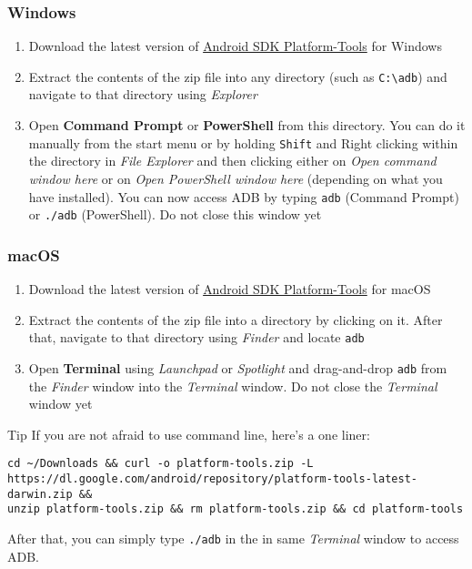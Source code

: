 \subsubsection{Windows} %
\begin{enumerate}
    \item Download the latest version of
    \href{https://dl.google.com/android/repository/platform-tools-latest-windows.zip}{Android SDK Platform-Tools} for
    Windows
    \item Extract the contents of the zip file into any directory (such as \texttt{C:\textbackslash{adb}}) and navigate
    to that directory using \textit{Explorer}
    \item Open \textbf{Command Prompt} or \textbf{PowerShell} from this directory. You can do it manually from the start
    menu or by holding \texttt{Shift} and Right clicking within the directory in \textit{File Explorer} and then
    clicking either on \textit{Open command window here} or on \textit{Open PowerShell window here} (depending on
    what you have installed). You can now access ADB by typing \texttt{adb} (Command Prompt) or \texttt{./adb}
    (PowerShell). Do not close this window yet
\end{enumerate}

\subsubsection{macOS} %
\begin{enumerate}
    \item Download the latest version of
    \href{https://dl.google.com/android/repository/platform-tools-latest-darwin.zip}{Android SDK Platform-Tools} for
    macOS
    \item Extract the contents of the zip file into a directory by clicking on it. After that, navigate to that
    directory using \textit{Finder} and locate \texttt{adb}
    \item Open \textbf{Terminal} using \textit{Launchpad} or \textit{Spotlight} and drag-and-drop \texttt{adb} from the
    \textit{Finder} window into the \textit{Terminal} window. Do not close the \textit{Terminal} window yet
\end{enumerate}

\begin{tip}{Tip}
    If you are not afraid to use command line, here's a one liner:
    \begin{verbatim}
cd ~/Downloads && curl -o platform-tools.zip -L
https://dl.google.com/android/repository/platform-tools-latest-darwin.zip &&
unzip platform-tools.zip && rm platform-tools.zip && cd platform-tools
    \end{verbatim}
    After that, you can simply type \texttt{./adb} in the in same \textit{Terminal} window to access ADB\@.
\end{tip}

